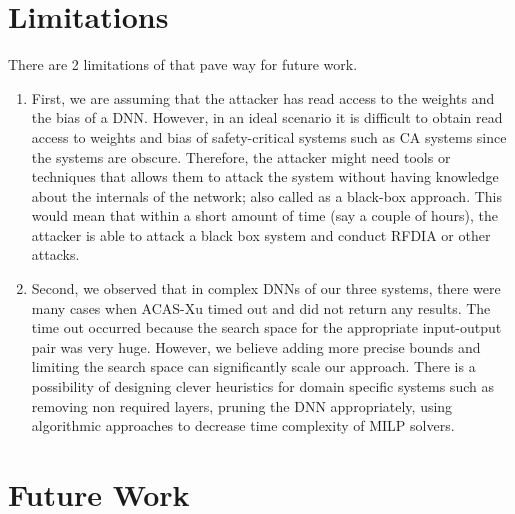 \section{ Limitations}

There are 2 limitations of \tool that pave way for future work. 
\begin{enumerate}
	\item First, we are assuming that the attacker has read access to the weights and the bias of a \ac{DNN}.
	However, in an ideal scenario it is difficult to obtain read access to weights and bias of safety-critical systems such as \ac{CA} systems since the systems are obscure. 
	Therefore, the attacker might need tools or techniques that allows them to attack the system without having knowledge about the internals of the network; also called as a black-box approach. 
	This would mean that within a short amount of time (say a couple of hours), the attacker is able to attack a black box system and conduct \ac{RFDIA} or other attacks. 
	\item Second, we observed that in complex \ac{DNN}s of our three systems, there were many cases when  \ac{ACAS-Xu} timed out and did not return any results. 
	The time out occurred because the search space for the appropriate input-output pair was very huge. 
	However, we believe adding more precise bounds and limiting the search space can significantly scale our approach. 
	There is a possibility of designing clever heuristics for domain specific systems such as removing non required layers, pruning the \ac{DNN} appropriately, using algorithmic approaches to decrease time complexity of \ac{MILP} solvers. 
	
	\label{section:limitations}
	
\end{enumerate}

\section{ Future Work}

